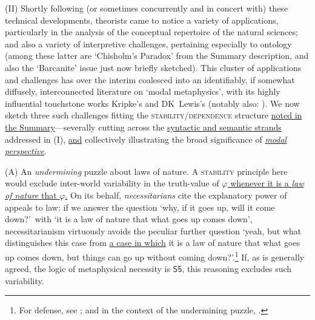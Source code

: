 \documentclass[12pt]{article}
\begin{document}
\smallskip{}

(II) Shortly following (or sometimes concurrently and in concert with) these
technical developments, theorists came to notice a variety of applications,
particularly in the analysis of the conceptual repertoire of the natural
sciences; and also a variety of interpretive challenges, pertaining especially
to ontology (among these latter are `Chisholm's Paradox' from the Summary
description, and also the `Barcanite' issue just now briefly sketched). This
cluster of applications and challenges has over the interim coalesced into an
identifiably, if somewhat diffusely, interconnected literature on `modal
metaphysics', with its highly influential touchstone works Kripke's
\citep{kripke72} and DK~Lewis's \citep{lewis86} (notably also:
\citep{Plantinga1974-PLATNO,VanInwagen1990-VANMB,sider01,finetime,Hawthorne2006-HAWME}).
We now sketch three such challenges fitting the
\textsc{stability}/\textsc{dependence} structure \ul{noted in the Summary}---severally cutting across
the \ul{syntactic and semantic strands} addressed in (I), \ul{and} collectively illustrating the broad
significance of \ul{\emph{modal perspective}}.

(A) An \emph{undermining} puzzle about laws of nature. A \textsc{stability}
principle here would exclude inter-world variability in the truth-value of
\ul{$\varphi$ whenever it is a \emph{law of nature} that $\varphi$.} 
On its behalf, \emph{necessitarians}
cite the explanatory power of appeals to law: if we answer the question `why,
if it goes up, will it come down?'\ with `it is a law of nature that what goes
up comes down', necessitarianism virtuously avoids the peculiar further
question `yeah, but what distinguishes this case from \ul{a case in which} 
it is a law of nature that what goes up comes down, but things can go up
without coming down?'.\footnote{For defense, see \citep{loewer96,loewer12};
and in the context of the undermining puzzle, \citep[p.~247]{finevn}.} If, as
is generally agreed, the logic of metaphysical necessity is $\mathsf{S5}$,
this reasoning excludes such variability.
\end{document}
